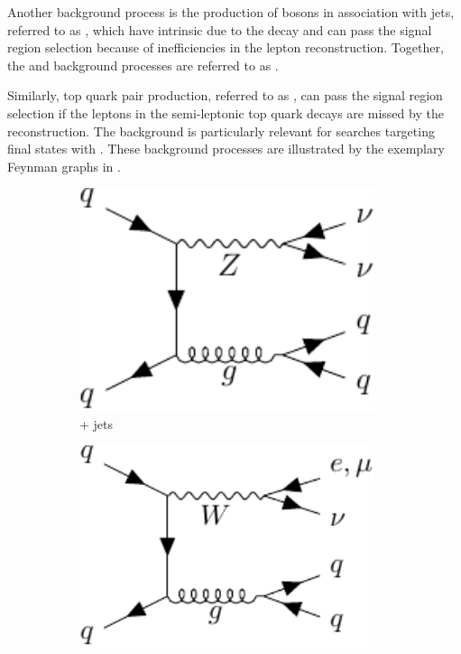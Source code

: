 Another background process is the production of \PW bosons in association with jets, referred to as \wjets, which have intrinsic \met due to the \HepProcess{\PW \to \Pl \Pgn} decay and can pass the signal region selection because of inefficiencies in the lepton reconstruction.
Together, the \zjets and \wjets background processes are referred to as \vjets.

Similarly, top quark pair production, referred to as \ttbar, can pass the signal region selection if the leptons in the semi-leptonic top quark decays are missed by the reconstruction. The \ttbar background is particularly relevant for searches targeting final states with \bjets.
These background processes are illustrated by the exemplary Feynman graphs in .

\begin{figure}[htbp]
    \centering
    \begin{subfigure}{0.3\textwidth}
      \centering
      \includegraphics[width=0.95\textwidth]{figures/common/physics/zjets.pdf}
      \caption{\PZ + jets}
    \end{subfigure}
    \hfill
    \begin{subfigure}{0.3\textwidth}
      \centering
      \includegraphics[width=0.95\textwidth]{figures/common/physics/wjets.pdf}

\end{subfigure}
\end{figure}
